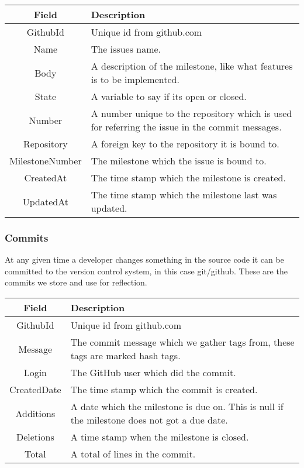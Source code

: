 \vspace{0.5cm}
\begin{tabularx}{\linewidth}{| c | X |}
    \hline
    \rowcolor[gray]{0.8}
    \textbf{Field} & \textbf{Description} \\
    \hline
    GithubId & Unique id from github.com\\ \hline
    Name & The issues name.\\ \hline
   	Body & A description of the milestone, like what features is to be implemented.\\ \hline
    State & A variable to say if its open or closed.\\ \hline
    Number & A number unique to the repository which is used for referring the issue in the commit messages.\\ \hline
    Repository & A foreign key to the repository it is bound to.\\ \hline
    MilestoneNumber & The milestone which the issue is bound to.\\ \hline
    CreatedAt & The time stamp which the milestone is created.\\ \hline
    UpdatedAt & The time stamp which the milestone last was updated.\\ 
    \hline
\end{tabularx}
\vspace{0.5cm}

\subsubsection*{Commits}
At any given time a developer changes something in the source code it can be committed to the version control system, in this case git/github. These are the commits we store and use for reflection. \\

\vspace{0.5cm}
\begin{tabularx}{\linewidth}{| c | X |}
    \hline
    \rowcolor[gray]{0.8}
    \textbf{Field} & \textbf{Description} \\
    \hline
    GithubId & Unique id from github.com\\ \hline
    Message & The commit message which we gather tags from, these tags are marked hash tags.\\ \hline
   	Login & The GitHub user which did the commit.\\ \hline
    CreatedDate & The time stamp which the commit is created.\\ \hline
    Additions & A date which the milestone is due on. This is null if the milestone does not got a due date.\\ \hline
    Deletions & A time stamp when the milestone is closed.\\ \hline
    Total & A total of lines in the commit.\\
    \hline
\end{tabularx}
\vspace{0.5cm}

